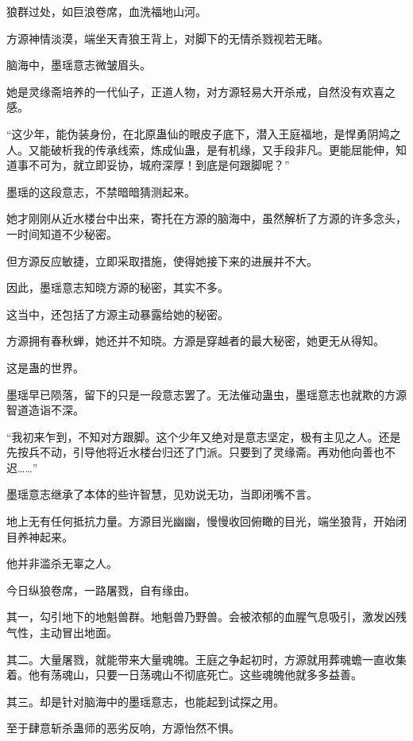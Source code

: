 
\begin{this_body}

狼群过处，如巨浪卷席，血洗福地山河。

方源神情淡漠，端坐天青狼王背上，对脚下的无情杀戮视若无睹。

脑海中，墨瑶意志微皱眉头。

她是灵缘斋培养的一代仙子，正道人物，对方源轻易大开杀戒，自然没有欢喜之感。

“这少年，能伪装身份，在北原蛊仙的眼皮子底下，潜入王庭福地，是悍勇阴鸠之人。又能破析我的传承线索，炼成仙蛊，是有机缘，又手段非凡。更能屈能伸，知道事不可为，就立即妥协，城府深厚！到底是何跟脚呢？”

墨瑶的这段意志，不禁暗暗猜测起来。

她才刚刚从近水楼台中出来，寄托在方源的脑海中，虽然解析了方源的许多念头，一时间知道不少秘密。

但方源反应敏捷，立即采取措施，使得她接下来的进展并不大。

因此，墨瑶意志知晓方源的秘密，其实不多。

这当中，还包括了方源主动暴露给她的秘密。

方源拥有春秋蝉，她还并不知晓。方源是穿越者的最大秘密，她更无从得知。

这是蛊的世界。

墨瑶早已陨落，留下的只是一段意志罢了。无法催动蛊虫，墨瑶意志也就欺的方源智道造诣不深。

“我初来乍到，不知对方跟脚。这个少年又绝对是意志坚定，极有主见之人。还是先按兵不动，引导他将近水楼台归还了门派。只要到了灵缘斋。再劝他向善也不迟……”

墨瑶意志继承了本体的些许智慧，见劝说无功，当即闭嘴不言。

地上无有任何抵抗力量。方源目光幽幽，慢慢收回俯瞰的目光，端坐狼背，开始闭目养神起来。

他并非滥杀无辜之人。

今日纵狼卷席，一路屠戮，自有缘由。

其一，勾引地下的地魁兽群。地魁兽乃野兽。会被浓郁的血腥气息吸引，激发凶残气性，主动冒出地面。

其二。大量屠戮，就能带来大量魂魄。王庭之争起初时，方源就用葬魂蟾一直收集着。他有荡魂山，只要一日荡魂山不彻底死亡。这些魂魄他就多多益善。

其三。却是针对脑海中的墨瑶意志，也能起到试探之用。

至于肆意斩杀蛊师的恶劣反响，方源怡然不惧。


\end{this_body}
